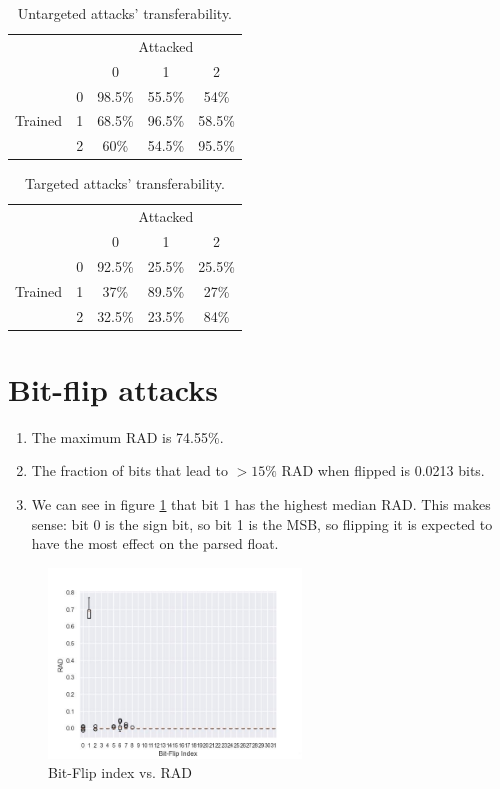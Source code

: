 \documentclass[12pt, a4paper]{article}
\begin{document}
\begin{table}[hbt]
  \begin{center}
    \begin{tabular}{|c|c||c|c|c|}
      \cline{3-5}
    \multicolumn{2}{c||}{} & \multicolumn{3}{|c|}{Attacked} \\
      \cline{3-5}
    \multicolumn{2}{c||}{} & 0 & 1 & 2 \\
      \hline \hline
    & 0 & 98.5\% & 55.5\% & 54\%\\
      \cline{2-5}
    Trained & 1 & 68.5\% & 96.5\% & 58.5\%\\
      \cline{2-5}
    & 2 & 60\% & 54.5\% & 95.5\%\\
      \hline
    \end{tabular}
    \caption{Untargeted attacks' transferability.}
  \end{center}
  \label{tab:ut-trans}
\end{table}

\begin{table}[hbt]
  \begin{center}
    \begin{tabular}{|c|c||c|c|c|}
      \cline{3-5}
    \multicolumn{2}{c||}{} & \multicolumn{3}{|c|}{Attacked} \\
      \cline{3-5}
    \multicolumn{2}{c||}{} & 0 & 1 & 2 \\
      \hline \hline
    & 0 & 92.5\% & 25.5\% & 25.5\%\\
      \cline{2-5}
    Trained & 1 & 37\% & 89.5\% & 27\%\\
      \cline{2-5}
    & 2 & 32.5\% & 23.5\% & 84\%\\
      \hline
    \end{tabular}
    \caption{Targeted attacks' transferability.}
  \end{center}
  \label{tab:t-trans}
\end{table}


\section{Bit-flip attacks}

\begin{enumerate}
  \item The maximum RAD is 74.55\%. 
  \item The fraction of bits that lead to $>15\%$ RAD when flipped is 0.0213 bits. 
  \item We can see in figure \ref{fig:bf} that bit 1 has the highest median RAD. This makes sense: bit 0 is the sign bit, so bit 1 is the MSB, so flipping it is expected to have the most effect on the parsed float. 
\end{enumerate}

\begin{figure}[hbt]
  \centering
  \includegraphics[width=0.6\textwidth]{bf_idx-vs-RAD}  
  \caption{Bit-Flip index vs. RAD}
  \label{fig:bf}
\end{figure}
\end{document}
